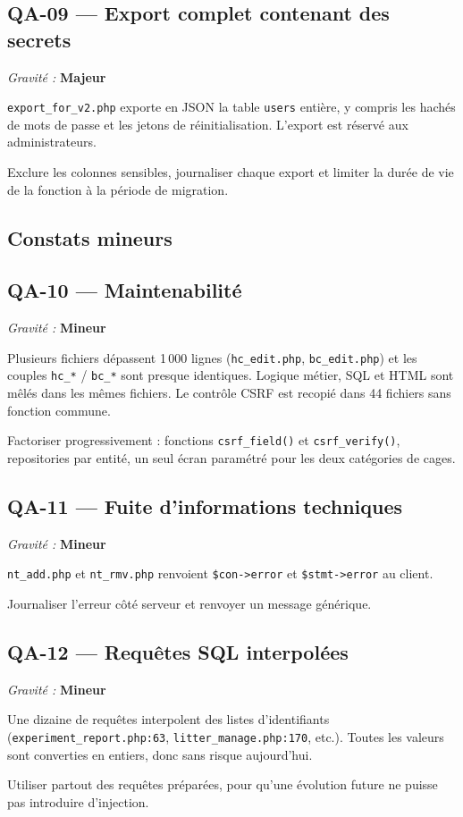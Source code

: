 \documentclass[11pt,a4paper]{article}
\newcommand{\maj}{\textcolor{maj}{\textbf{Majeur}}}
\newcommand{\mineur}{\textcolor{min}{\textbf{Mineur}}}
\newcommand{\f}[1]{\nolinkurl{#1}}
\newenvironment{constat}[3]{%
  \subsection*{#1 --- #2}\noindent\textit{Gravité :} #3\par\smallskip
  \begin{description}[leftmargin=2.6cm,style=nextline,itemsep=2pt]}{\end{description}}
\begin{document}
\begin{constat}{QA-09}{Export complet contenant des secrets}{\maj}
\item[Preuve] \f{export_for_v2.php} exporte en JSON la table \f{users} entière,
  y compris les hachés de mots de passe et les jetons de réinitialisation.
  L'export est réservé aux administrateurs.
\item[Action] Exclure les colonnes sensibles, journaliser chaque export et
  limiter la durée de vie de la fonction à la période de migration.
\end{constat}

\subsection{Constats mineurs}

\begin{constat}{QA-10}{Maintenabilité}{\mineur}
\item[Preuve] Plusieurs fichiers dépassent 1\,000 lignes (\f{hc_edit.php},
  \f{bc_edit.php}) et les couples \f{hc_*} / \f{bc_*} sont presque identiques.
  Logique métier, SQL et HTML sont mêlés dans les mêmes fichiers. Le contrôle
  CSRF est recopié dans 44 fichiers sans fonction commune.
\item[Action] Factoriser progressivement : fonctions \f{csrf_field()} et
  \f{csrf_verify()}, repositories par entité, un seul écran paramétré pour les
  deux catégories de cages.
\end{constat}

\begin{constat}{QA-11}{Fuite d'informations techniques}{\mineur}
\item[Preuve] \f{nt_add.php} et \f{nt_rmv.php} renvoient \f{$con->error} et
  \f{$stmt->error} au client.
\item[Action] Journaliser l'erreur côté serveur et renvoyer un message générique.
\end{constat}

\begin{constat}{QA-12}{Requêtes SQL interpolées}{\mineur}
\item[Preuve] Une dizaine de requêtes interpolent des listes d'identifiants
  (\f{experiment_report.php:63}, \f{litter_manage.php:170}, etc.). Toutes les
  valeurs sont converties en entiers, donc sans risque aujourd'hui.
\item[Action] Utiliser partout des requêtes préparées, pour qu'une évolution
  future ne puisse pas introduire d'injection.
\end{constat}
\end{document}
